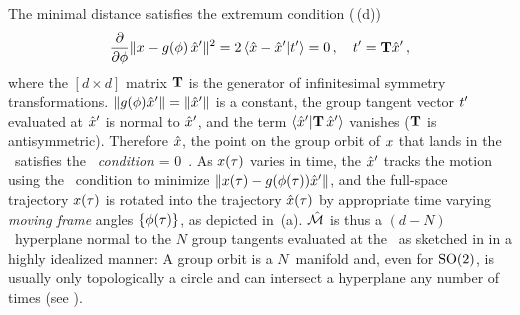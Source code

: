 \documentclass[aip,cha,reprint,
secnumarabic,
nofootinbib, tightenlines,
nobibnotes, showkeys, showpacs,
groupedaddress
]{revtex4-1}
\begin{document}
The minimal distance satisfies
the extremum condition (\,(d))
\[
\frac{\partial}{\partial \gSpace} \Norm{\ssp - \LieEl(\gSpace)\,\slicep}^2
   =
2\, \braket{\sspRed - \slicep}{\sliceTan{}}
   = 0
        \,,\quad
\sliceTan{} = \Lg \slicep
\,,
\]
where the $[d\!\times\!d]$ matrix $\mathbf{T}$ is the generator of infinitesimal
symmetry transformations. $\|{g({\bf \phi}){\hat{x}'}}\|= \|{{\hat{x}'}}\|$
is a constant, the group tangent vector $t'_{}$ evaluated at
${\hat{x}'}$ is normal to ${\hat{x}'}$, and the term $\braket{\slicep}{\Lg
\,\slicep}$ vanishes ($\mathbf{T}$ is antisymmetric). Therefore  $\hat{x}$, the
point on the group orbit of $x$ that lands in the \slice\ satisfies
the \emph{\slice\ condition}
\beq
\braket{\sspRed}{\sliceTan{}} = 0
    \,.
As $x(\tau)$ varies in time, the {\template} ${\hat{x}'}$ tracks the
motion using the \slice\ condition  to minimize
$\|{x(\tau)-g(\phi(\tau)){\hat{x}'}}\|$, and the full-space
trajectory $x(\tau)$ is rotated into the {\reducedsp} trajectory
$\hat{x}(\tau)$ by appropriate time varying \emph{moving frame} angles
$\{{\bf \phi}(\tau)\}$, as depicted in \,{(a)}. $\hat{\cal M}$
is thus a $(d\!-\!N)$\dmn\ hyperplane normal to the $N$ group tangents
evaluated at the \slicep\ as sketched in  in a highly
idealized manner: A group orbit is a $N$\dmn\ manifold and, even for
$\textrm{SO}(2)$, is usually only topologically a circle and can intersect a
hyperplane any number of times  (see
).


\end{document}

